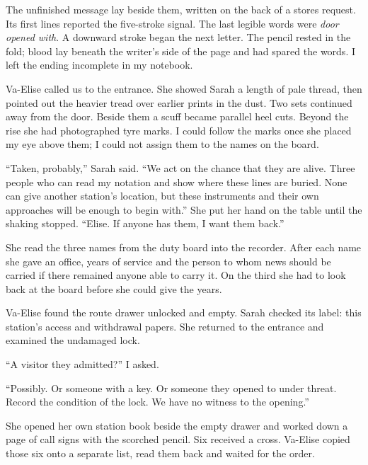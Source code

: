 The unfinished message lay beside them, written on the back of a stores request. Its first lines reported the five-stroke signal. The last legible words were \emph{door opened with}. A downward stroke began the next letter. The pencil rested in the fold; blood lay beneath the writer's side of the page and had spared the words. I left the ending incomplete in my notebook.\par

Va-Elise called us to the entrance. She showed Sarah a length of pale thread, then pointed out the heavier tread over earlier prints in the dust. Two sets continued away from the door. Beside them a scuff became parallel heel cuts. Beyond the rise she had photographed tyre marks. I could follow the marks once she placed my eye above them; I could not assign them to the names on the board.\par

``Taken, probably,'' Sarah said. ``We act on the chance that they are alive. Three people who can read my notation and show where these lines are buried. None can give another station's location, but these instruments and their own approaches will be enough to begin with.'' She put her hand on the table until the shaking stopped. ``Elise. If anyone has them, I want them back.''\par

She read the three names from the duty board into the recorder. After each name she gave an office, years of service and the person to whom news should be carried if there remained anyone able to carry it. On the third she had to look back at the board before she could give the years.\par

Va-Elise found the route drawer unlocked and empty. Sarah checked its label: this station's access and withdrawal papers. She returned to the entrance and examined the undamaged lock.\par

``A visitor they admitted?'' I asked.\par

``Possibly. Or someone with a key. Or someone they opened to under threat. Record the condition of the lock. We have no witness to the opening.''\par

She opened her own station book beside the empty drawer and worked down a page of call signs with the scorched pencil. Six received a cross. Va-Elise copied those six onto a separate list, read them back and waited for the order.\par

